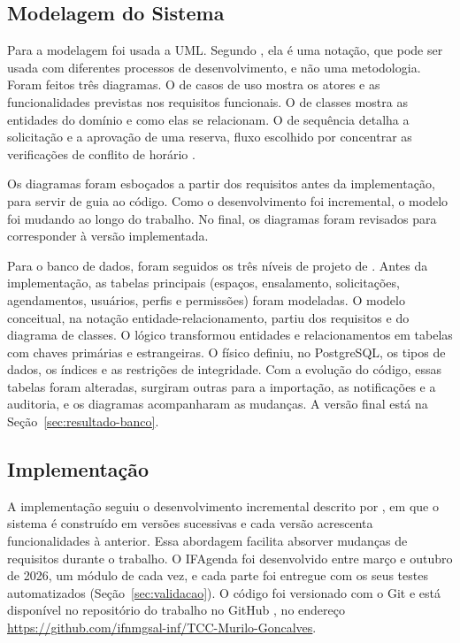\subsection{Modelagem do Sistema}
\label{sec:modelagem}

Para a modelagem foi usada a UML. Segundo , ela é uma notação, que pode ser usada com diferentes processos de desenvolvimento, e não uma metodologia. Foram feitos três diagramas. O de casos de uso mostra os atores e as funcionalidades previstas nos requisitos funcionais. O de classes mostra as entidades do domínio e como elas se relacionam. O de sequência detalha a solicitação e a aprovação de uma reserva, fluxo escolhido por concentrar as verificações de conflito de horário \cite{bezerra2007,larman2007}.

Os diagramas foram esboçados a partir dos requisitos antes da implementação, para servir de guia ao código. Como o desenvolvimento foi incremental, o modelo foi mudando ao longo do trabalho. No final, os diagramas foram revisados para corresponder à versão implementada.

Para o banco de dados, foram seguidos os três níveis de projeto de . Antes da implementação, as tabelas principais (espaços, ensalamento, solicitações, agendamentos, usuários, perfis e permissões) foram modeladas. O modelo conceitual, na notação entidade-relacionamento, partiu dos requisitos e do diagrama de classes. O lógico transformou entidades e relacionamentos em tabelas com chaves primárias e estrangeiras. O físico definiu, no PostgreSQL, os tipos de dados, os índices e as restrições de integridade. Com a evolução do código, essas tabelas foram alteradas, surgiram outras para a importação, as notificações e a auditoria, e os diagramas acompanharam as mudanças. A versão final está na Seção~\ref{sec:resultado-banco}.

\subsection{Implementação}
\label{sec:implementacao}

A implementação seguiu o desenvolvimento incremental descrito por , em que o sistema é construído em versões sucessivas e cada versão acrescenta funcionalidades à anterior. Essa abordagem facilita absorver mudanças de requisitos durante o trabalho. O IFAgenda foi desenvolvido entre março e outubro de 2026, um módulo de cada vez, e cada parte foi entregue com os seus testes automatizados (Seção~\ref{sec:validacao}). O código foi versionado com o Git e está disponível no repositório do trabalho no GitHub \cite{goncalves2026ifagenda}, no endereço \url{https://github.com/ifnmgsal-inf/TCC-Murilo-Goncalves}.

